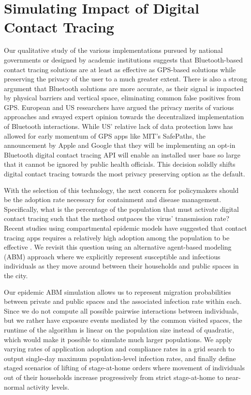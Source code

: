 \documentclass{article}
\begin{document}
\section{Simulating Impact of Digital Contact Tracing}

Our qualitative study of the various implementations pursued by national governments or designed by academic institutions suggests that Bluetooth-based contact tracing solutions are at least as effective as GPS-based solutions while preserving the privacy of the user to a much greater extent. There is also a strong argument that Bluetooth solutions are more accurate, as their signal is impacted by physical barriers and vertical space, eliminating common false positives from GPS. European and US researchers have argued the privacy merits of various approaches and swayed expert opinion towards the decentralized implementation of Bluetooth interactions. While US’ relative lack of data protection laws has allowed for early momentum of GPS apps like MIT’s SafePaths, the announcement by Apple and Google that they will be implementing an opt-in Bluetooth digital contact tracing API will enable an installed user base so large that it cannot be ignored by public health officials. This decision solidly shifts digital contact tracing towards the most privacy preserving option as the default.

With the selection of this technology, the next concern for policymakers should be the adoption rate necessary for containment and disease management. Specifically, what is the percentage of the population that must activate digital contact tracing such that the method outpaces the virus’ transmission rate? Recent studies using compartmental epidemic models have suggested that contact tracing apps requires a relatively high adoption among the population to be effective \cite{Ferrettieabb6936}. We revisit this question using an alternative agent-based modeling (ABM) approach \cite{ABMOverview} where we explicitly represent susceptible and infectious individuals as they move around between their households and public spaces in the city.

Our epidemic ABM simulation allows us to represent migration probabilities between private and public spaces and the associated infection rate within each. Since we do not compute all possible pairwise interactions between individuals, but we rather have exposure events mediated by the common visited spaces, the runtime of the algorithm is linear on the population size instead of quadratic, which would make it possible to simulate much larger populations. We apply varying rates of application adoption and compliance rates in a grid search to output single-day maximum population-level infection rates, and finally define staged scenarios of lifting of stage-at-home orders where movement of individuals out of their households increase progressively from strict stage-at-home to near-normal activity levels.
\end{document}
